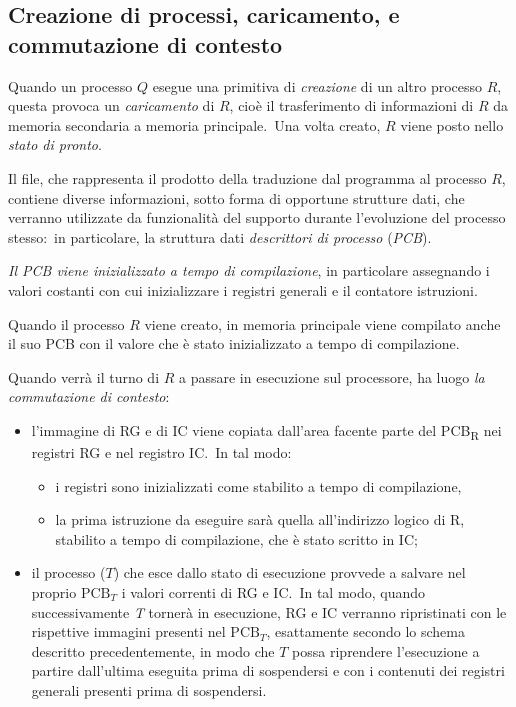 \subsection{Creazione di processi, caricamento, e commutazione di contesto}

Quando un processo $Q$ esegue una primitiva di \textit{creazione} di un altro processo $R$, questa provoca un \textit{caricamento} di $R$, cioè il trasferimento di informazioni di $R$ da memoria secondaria a memoria principale.\
Una volta creato, $R$ viene posto nello \textit{stato di pronto}.

Il file, che rappresenta il prodotto della traduzione dal programma al processo $R$, contiene diverse informazioni, sotto forma di opportune strutture dati, che verranno utilizzate da funzionalità del supporto durante l'evoluzione del processo stesso:\ in particolare, la struttura dati \textit{descrittori di processo} (\textit{PCB}).

\textit{Il PCB viene inizializzato a tempo di compilazione}, in particolare assegnando i valori costanti con cui inizializzare i registri generali e il contatore istruzioni.

Quando il processo $R$ viene creato, in memoria principale viene compilato anche il suo PCB con il valore che è stato inizializzato a tempo di compilazione.

Quando verrà il turno di $R$ a passare in esecuzione sul processore, ha luogo \textit{la commutazione di contesto}:

\begin{itemize}
    \item l'immagine di RG e di IC viene copiata dall'area facente parte del PCB\textsubscript{R} nei registri RG e nel registro IC.\ In tal modo:
          \begin{itemize}
              \item i registri sono inizializzati come stabilito a tempo di compilazione,
              \item la prima istruzione da eseguire sarà quella all'indirizzo logico di R, stabilito a tempo di compilazione, che è stato scritto in IC;
          \end{itemize}
    \item il processo ($T$) che esce dallo stato di esecuzione provvede a salvare nel proprio $\mathrm{PCB}_T$ i valori correnti di RG e IC.\ In tal modo, quando successivamente \textit{T} tornerà in esecuzione, RG e IC verranno ripristinati con le rispettive immagini presenti nel $\mathrm{PCB}_T$, esattamente secondo lo schema descritto precedentemente, in modo che $T$ possa riprendere l'esecuzione a partire dall'ultima eseguita prima di sospendersi e con i contenuti dei registri generali presenti prima di sospendersi.
\end{itemize}

